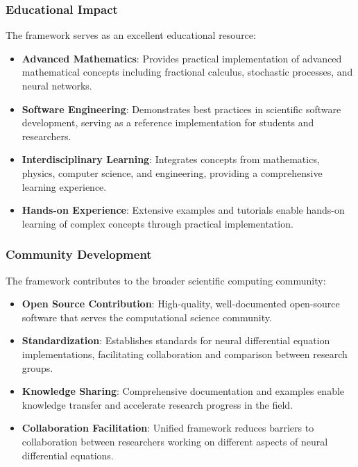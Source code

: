 \subsubsection{Educational Impact}

The framework serves as an excellent educational resource:

\begin{itemize}
    \item \textbf{Advanced Mathematics}: Provides practical implementation of advanced mathematical concepts including fractional calculus, stochastic processes, and neural networks.
    
    \item \textbf{Software Engineering}: Demonstrates best practices in scientific software development, serving as a reference implementation for students and researchers.
    
    \item \textbf{Interdisciplinary Learning}: Integrates concepts from mathematics, physics, computer science, and engineering, providing a comprehensive learning experience.
    
    \item \textbf{Hands-on Experience}: Extensive examples and tutorials enable hands-on learning of complex concepts through practical implementation.
\end{itemize}

\subsubsection{Community Development}

The framework contributes to the broader scientific computing community:

\begin{itemize}
    \item \textbf{Open Source Contribution}: High-quality, well-documented open-source software that serves the computational science community.
    
    \item \textbf{Standardization}: Establishes standards for neural differential equation implementations, facilitating collaboration and comparison between research groups.
    
    \item \textbf{Knowledge Sharing}: Comprehensive documentation and examples enable knowledge transfer and accelerate research progress in the field.
    
    \item \textbf{Collaboration Facilitation}: Unified framework reduces barriers to collaboration between researchers working on different aspects of neural differential equations.
\end{itemize}

